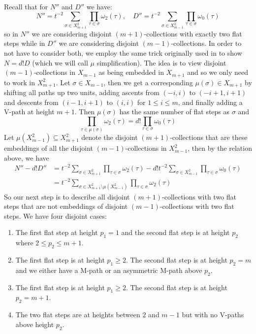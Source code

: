 \documentclass[11pt]{article}
\theoremstyle{mythm}
\begin{document}
Recall that for $N''$ and $D''$ we have:
\begin{equation*}
N'' = t^{-2}\sum\limits_{\sigma\in X_{m+1}^2}\prod\limits_{\tau\in\sigma}\omega_2(\tau),\quad D'' = t^{-2}\sum\limits_{\sigma\in X_{m-1}^2}\prod\limits_{\tau\in\sigma}\omega_0(\tau)
\end{equation*}
so in $N''$ we are considering disjoint $(m+1)$-collections with exactly two flat steps while in $D''$ we are considering disjoint $(m-1)$-collections. In order to not have to consider both, we employ the same trick originally used in \cite{willerton_magnitude_2017} to show $N = d!D$ (which we will call $\mu$ simplification). The idea is to view disjoint $(m-1)$-collections in $X_{m-1}$ as being embedded in $X_{m+1}$ and so we only need to work in $X_{m+1}^2$. Let $\sigma \in X_{m-1}$, then we get a corresponding $\mu(\sigma)\in X_{m+1}$ by shifting all paths up two units, adding ascents from $(-i,i)$ to $(-i+1,i+1)$ and descents from $(i-1,i+1)$ to $(i,i)$ for $1\leq i \leq m$, and finally adding a V-path at height $m+1$. Then $\mu(\sigma)$ has the same number of flat steps as $\sigma$ and
\begin{equation*}
\prod\limits_{\tau\in\mu(\sigma)}\omega_2(\tau) = d!\prod\limits_{\tau\in\sigma}\omega_0(\tau)
\end{equation*}
Let $\mu(X_{m-1}^2)\subseteq X_{m+1}^2$ denote the disjoint $(m+1)$-collections that are these embeddings of all the disjoint $(m-1)$-collections in $X_{m-1}^2$, then by the relation above, we have
\begin{align*}
N''-d!D'' &= t^{-2}\sum\limits_{\sigma\in X_{m+1}^2}\prod\limits_{\tau\in\sigma}\omega_2(\tau) - d!t^{-2}\sum\limits_{\sigma\in X_{m-1}^2}\prod\limits_{\tau\in\sigma}\omega_0(\tau) \\
&= t^{-2}\sum\limits_{\sigma\in X_{m+1}^2\setminus\mu(X_{m-1}^2)}\prod\limits_{\tau\in\sigma}\omega_2(\tau)
\end{align*}
So our next step is to describe all disjoint $(m+1)$-collections with two flat steps that are not embeddings of disjoint $(m-1)$-collections with two flat steps. We have four disjoint cases:
\begin{enumerate}
\item The first flat step at height $p_1=1$ and the second flat step is at height $p_2$ where $2\leq p_2\leq m+1$.
\item The first flat step is at height $p_1 \geq 2$. The second flat step is at height $p_2 = m$ and we either have a M-path or an asymmetric M-path above $p_2$.
\item The first flat step is at height $p_1 \geq 2$. The second flat step is at height $p_2 = m+1$.
\item The two flat steps are at heights between $2$ and $m-1$ but with no V-paths above height $p_2$.
\end{enumerate}
\end{document}
